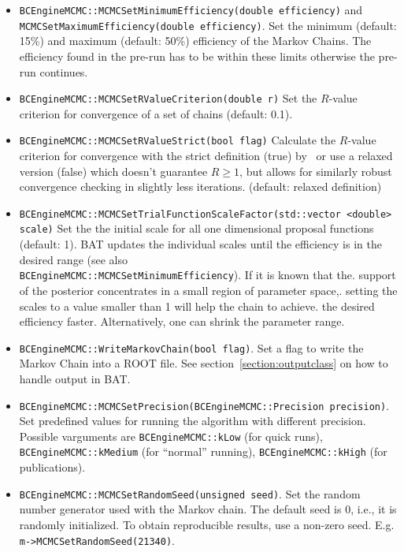 \documentclass[11pt, a4paper]{article}
\begin{document}
\begin{itemize}
\item \verb|BCEngineMCMC::MCMCSetMinimumEfficiency(double efficiency)| and \\
  \verb|MCMCSetMaximumEfficiency(double efficiency)|. Set the minimum
  (default: 15\%) and maximum (default: 50\%) efficiency of the Markov
  Chains. The efficiency found in the pre-run has to be within these
  limits otherwise the pre-run continues.

\item \verb|BCEngineMCMC::MCMCSetRValueCriterion(double r)| Set the
  $R$-value criterion for convergence of a set of chains (default:
  0.1).

\item \verb|BCEngineMCMC::MCMCSetRValueStrict(bool flag)| Calculate the
  $R$-value criterion for convergence with the strict definition (true)
  by~\cite{R_value}  or use a relaxed version (false) which doesn't guarantee
  $R \ge 1$, but allows for similarly robust convergence checking in slightly
  less iterations. (default: relaxed definition)

\item \verb|BCEngineMCMC::MCMCSetTrialFunctionScaleFactor(std::vector <double> scale)|
  Set the the initial scale for all one dimensional proposal functions (default: 1).
  BAT updates the individual scales until the efficiency is in the desired range
  (see also \\ \verb|BCEngineMCMC::MCMCSetMinimumEfficiency|). If it is known that the.
  support of the posterior concentrates in a small region of parameter space,.
  setting the scales to a value smaller than 1 will help the chain to achieve.
  the desired efficiency faster. Alternatively, one can shrink the parameter range.

\item \verb|BCEngineMCMC::WriteMarkovChain(bool flag)|. Set a flag to
 write the Markov Chain into a ROOT file. See
 section~\ref{section:outputclass} on how to handle output in BAT.

\item
  \verb|BCEngineMCMC::MCMCSetPrecision(BCEngineMCMC::Precision precision)|. Set
  predefined values for running the algorithm with different
  precision. Possible varguments are \linebreak \verb|BCEngineMCMC::kLow| (for
  quick runs), \verb|BCEngineMCMC::kMedium| (for ``normal'' running),
  \linebreak \verb|BCEngineMCMC::kHigh| (for publications).

  \item \verb|BCEngineMCMC::MCMCSetRandomSeed(unsigned seed)|. Set  the
  random number generator used with the Markov chain. The default seed is 0,
  i.e., it is randomly initialized. To obtain reproducible results, use a
  non-zero seed. E.g.  \verb|m->MCMCSetRandomSeed(21340)|.
\end{itemize}
\end{document}
